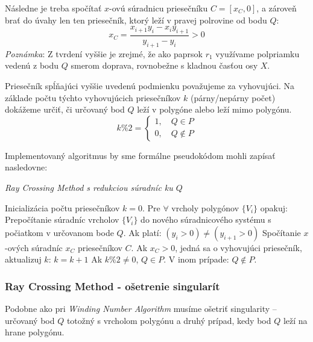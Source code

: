 \documentclass[11pt]{article}
\begin{document}
Následne je treba spočítať $x$-ovú súradnicu priesečníku $C=[x_C, 0]$, a zároveň brať do úvahy len ten priesečník, ktorý leží v pravej polrovine od bodu $Q$:
\begin{equation*}
x_C=\frac{x_{i+1} y_i - x_i y_{i+1}}{y_{i+1}-y_i}>0
\end{equation*}
\noindent \textit{Poznámka}: Z tvrdení vyššie je zrejmé, že ako paprsok $r_1$ využívame polpriamku vedenú z bodu $Q$ smerom doprava, rovnobežne s kladnou časťou osy $X$.

Priesečník spĺňajúci vyššie uvedenú podmienku považujeme za vyhovujúci. Na základe počtu týchto vyhovujúcich priesečníkov $k$ (párny/nepárny počet) dokážeme určiť, či určovaný 
bod $Q$ leží v polygóne alebo leží mimo polygónu.
\begin{equation*}
k\%2=
\begin{cases}
1, \quad Q \in P\\
0, \quad Q \notin P
\end{cases}
\end{equation*}

\noindent Implementovaný algoritmus by sme formálne pseudokódom mohli zapísať nasledovne:
\begin{algorithm}
    \caption {\textit{Ray Crossing Method s redukciou súradníc ku $Q$ }}
    \begin{algorithmic}[1]
        \State Inicializácia počtu priesečníkov $k=0$.
        \State Pre $\forall$ vrcholy polygónov $\{V_i\}$ opakuj:
        \State \indent Prepočítanie súradníc vrcholov $\{V_i\}$ do nového súradnicového systému s počiatkom v \newline \indent určovanom bode $Q$. 
        \State \indent Ak platí: $(y_i>0) \neq (y_{i+1}>0)$
        \State \indent \indent Spočítanie $x$-ových súradníc $x_C$ priesečníkov $C$.
        \State \indent \indent Ak $x_C>0$, jedná sa o vyhovujúci priesečník, aktualizuj $k$: $k=k+1$
        \State Ak $k\%2\neq0$, $Q \in P$.
        \State V inom prípade: $Q \notin P$.
    \end{algorithmic}
\end{algorithm}


\subsubsection{Ray Crossing Method - ošetrenie singularít}
Podobne ako pri \textit{Winding Number Algorithm} musíme ošetriť singularity -- určovaný bod $Q$ totožný s vrcholom polygónu a druhý prípad, kedy bod $Q$ leží na hrane polygónu.
\end{document}
